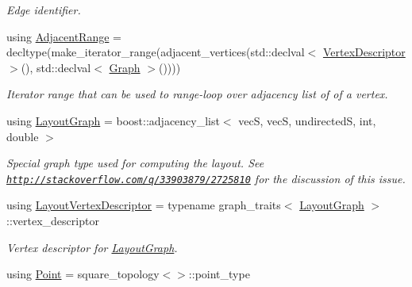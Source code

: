 \begin{DoxyCompactItemize}
\begin{DoxyCompactList}\small\item\em Edge identifier. \end{DoxyCompactList}\item 
using \hyperlink{structStateGraph_ad8748ccee490f071b10c59dc63c1819a}{Adjacent\+Range} = decltype(make\+\_\+iterator\+\_\+range(adjacent\+\_\+vertices(std\+::declval$<$ \hyperlink{structStateGraph_a95d7ea26b0d0d07d3488068a8e9be53c}{Vertex\+Descriptor} $>$(), std\+::declval$<$ \hyperlink{structStateGraph_a150e6f41e378ed1d2d78967244a23a68}{Graph} $>$())))\hypertarget{structStateGraph_ad8748ccee490f071b10c59dc63c1819a}{}\label{structStateGraph_ad8748ccee490f071b10c59dc63c1819a}

\begin{DoxyCompactList}\small\item\em Iterator range that can be used to range-\/loop over adjacency list of of a vertex. \end{DoxyCompactList}\item 
using \hyperlink{structStateGraph_a762277e4513dcf34ff0db4418b77a03f}{Layout\+Graph} = boost\+::adjacency\+\_\+list$<$ vecS, vecS, undirectedS, int, double $>$\hypertarget{structStateGraph_a762277e4513dcf34ff0db4418b77a03f}{}\label{structStateGraph_a762277e4513dcf34ff0db4418b77a03f}

\begin{DoxyCompactList}\small\item\em Special graph type used for computing the layout. See \href{http://stackoverflow.com/q/33903879/2725810}{\tt http\+://stackoverflow.\+com/q/33903879/2725810} for the discussion of this issue. \end{DoxyCompactList}\item 
using \hyperlink{structStateGraph_addf3dd025129b447de51b59254933697}{Layout\+Vertex\+Descriptor} = typename graph\+\_\+traits$<$ \hyperlink{structStateGraph_a762277e4513dcf34ff0db4418b77a03f}{Layout\+Graph} $>$\+::vertex\+\_\+descriptor\hypertarget{structStateGraph_addf3dd025129b447de51b59254933697}{}\label{structStateGraph_addf3dd025129b447de51b59254933697}

\begin{DoxyCompactList}\small\item\em Vertex descriptor for \hyperlink{structStateGraph_a762277e4513dcf34ff0db4418b77a03f}{Layout\+Graph}. \end{DoxyCompactList}\item 
using \hyperlink{structStateGraph_acd6bb467c5261e07f777dd1c4ea575c5}{Point} = square\+\_\+topology$<$$>$\+::point\+\_\+type\hypertarget{structStateGraph_acd6bb467c5261e07f777dd1c4ea575c5}{}\label{structStateGraph_acd6bb467c5261e07f777dd1c4ea575c5}


\end{DoxyCompactItemize}
